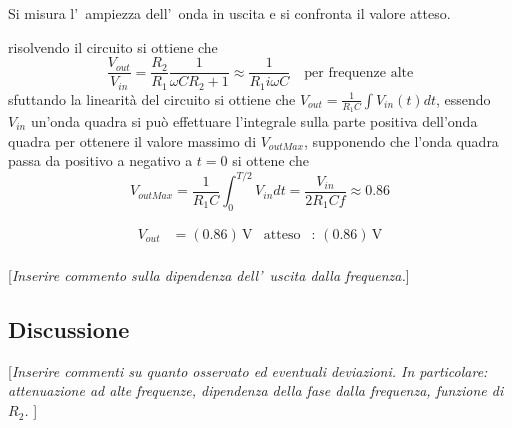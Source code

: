 \documentclass[10pt,a4paper]{article}
\newcommand{\rem}[1]{[\emph{#1}]}
\begin{document}
Si misura l'~ampiezza dell'~onda  in uscita e si confronta il valore atteso.\newline

risolvendo  il circuito si ottiene che
\[
	\frac{V_{out}}{V_{in}}=\frac{R_2}{R_1}\frac{1}{\omega C R_2 +1}\approx \frac{1}{R_1i\omega C}\quad \textrm{per frequenze alte}
\]
sfuttando la linearità del circuito si ottiene che $V_{out}=\frac{1}{R_1C}\int V_{in}(t)dt$, essendo $V_{in}$ un'onda quadra si può effettuare l'integrale sulla parte positiva dell'onda quadra per ottenere il valore massimo di $V_{outMax}$, supponendo che l'onda quadra passa da positivo a negativo a $t=0$ si ottene che
\begin{equation}
	V_{outMax}=\frac{1}{R_1C}\int_0^{T/2}V_{in}dt=\frac{V_{in}}{2R_1Cf}\approx 0.86
\end{equation}

\begin{align*}
V_{out} &= (0.86 )\,\mathrm{V} & \mathrm{atteso} &:\,(0.86  )\, \mathrm{V}  \\
\end{align*}

\rem{Inserire commento sulla dipendenza dell'~uscita dalla frequenza.}
%

\subsection{Discussione}
 
\rem{Inserire commenti su quanto osservato ed eventuali deviazioni. 
In particolare: attenuazione ad alte frequenze, dipendenza della fase dalla frequenza, funzione di $R_2$. }

\end{document}
